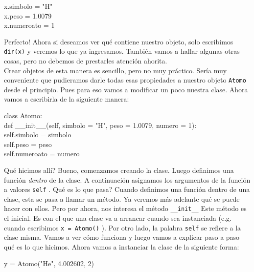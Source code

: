 \documentclass[10pt,letterpaper]{article}
\newcommand{\inlinecode}[1]{
\colorbox{light-gray}{\texttt{#1}}
}
\newenvironment{Code}
{
\begin{lrbox}{\selvestebox}%
\begin{minipage}{\dimexpr\columnwidth-2\fboxsep\relax}
\fontfamily{\ttdefault}\selectfont
}
{\end{minipage}\end{lrbox}%
\begin{center}
\colorbox{light-gray}{\usebox{\selvestebox}}
\end{center}
}
\begin{document}
\begin{Code}
x.simbolo = "H"\\
x.peso = 1.0079\\
x.numeroato = 1
\end{Code}

Perfecto! Ahora si deseamos ver qu\'e contiene nuestro objeto, solo escribimos \inlinecode{dir(x)} y veremos lo que ya ingresamos. Tambi\'en vamos a hallar algunas otras cosas, pero no debemos de prestarles atenci\'on ahorita.\\

Crear objetos de esta manera es sencillo, pero no muy pr\'actico. Ser\'ia muy conveniente que pudieramos darle todas esas propiedades a nuestro objeto \inlinecode{Atomo} desde el principio. Pues para eso vamos a modificar un poco nuestra clase. Ahora vamos a escribirla de la siguiente manera:

\begin{Code}
class Atomo:\\
\hspace*{4mm} def \_\_init\_\_(self, simbolo = "H", peso = 1.0079, numero = 1):\\
\hspace*{10mm} self.simbolo = simbolo\\
\hspace*{10mm} self.peso = peso\\
\hspace*{10mm} self.numeroato = numero
\end{Code}

Qu\'e hicimos all\'i? Bueno, comenzamos creando la clase. Luego definimos una funci\'on \emph{dentro} de la clase. A continuaci\'on asignamos los argumentos de la funci\'on a valores \inlinecode{self}. Qu\'e es lo que pasa? Cuando definimos una funci\'on dentro de una clase, esta se pasa a llamar un m\'etodo. Ya veremos m\'as adelante qu\'e se puede hacer con ellos. Pero por ahora, nos interesa el m\'etodo \inlinecode{\_\_init\_\_} Este m\'etodo es el inicial. Es con el que una clase va a arrancar cuando sea instanciada (e.g. cuando escribimos \inlinecode{x = Atomo()}). Por otro lado, la palabra \inlinecode{self} se refiere a la clase misma. Vamos a ver c\'omo funciona y luego vamos a explicar paso a paso qu\'e es lo que hicimos. Ahora vamos a instanciar la clase de la siguiente forma:

\begin{Code}
y = Atomo("He", 4.002602, 2)
\end{Code}
\end{document}

